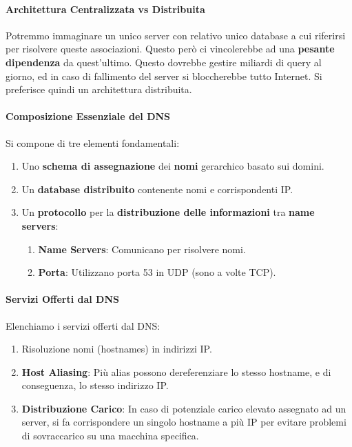 \documentclass{article}
\begin{document}
\paragraph{Architettura Centralizzata vs Distribuita} Potremmo immaginare un unico server con relativo unico database a cui riferirsi per risolvere queste associazioni. Questo però ci vincolerebbe ad una \textbf{pesante dipendenza} da quest'ultimo. Questo dovrebbe gestire miliardi di query al giorno, ed in caso di fallimento del server si bloccherebbe tutto Internet. Si preferisce quindi un architettura distribuita.

\paragraph{Composizione Essenziale del DNS} Si compone di tre elementi fondamentali:

\begin{enumerate}
    \item Uno \textbf{schema di assegnazione} dei \textbf{nomi} gerarchico basato sui domini.
    \item Un \textbf{database distribuito} contenente nomi e corrispondenti IP.
    \item Un \textbf{protocollo} per la \textbf{distribuzione delle informazioni} tra \textbf{name servers}:
    \begin{enumerate}
        \item \textbf{Name Servers}: Comunicano per risolvere nomi.
        \item \textbf{Porta}: Utilizzano porta 53 in UDP (sono a volte TCP).
    \end{enumerate}
\end{enumerate}

\newpage

\paragraph{Servizi Offerti dal DNS} Elenchiamo i servizi offerti dal DNS:

\begin{enumerate}
    \item Risoluzione nomi (hostnames) in indirizzi IP.
    \item \textbf{Host Aliasing}: Più alias possono dereferenziare lo stesso hostname, e di conseguenza, lo stesso indirizzo IP.
    \item \textbf{Distribuzione Carico}: In caso di potenziale carico elevato assegnato ad un server, si fa corrispondere un singolo hostname a più IP per evitare problemi di sovraccarico su una macchina specifica.
    
\end{enumerate}
\end{document}
